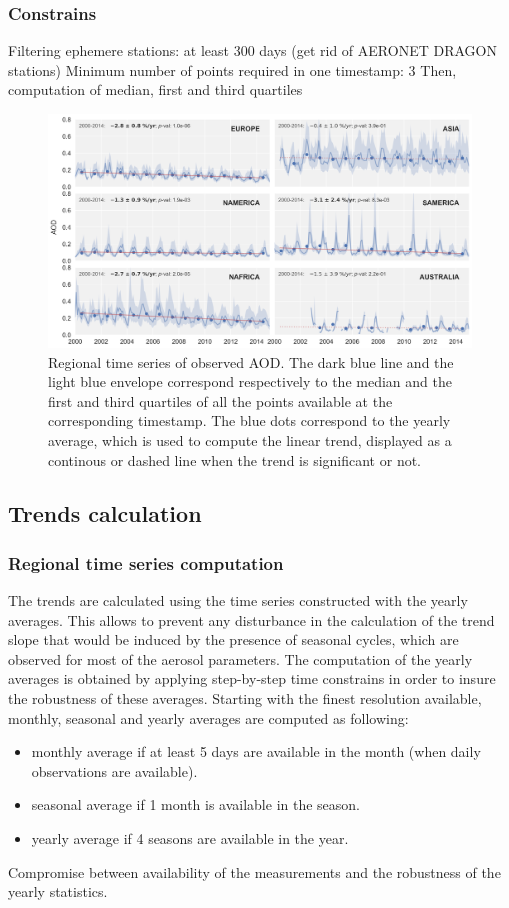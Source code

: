 \documentclass[journal abbreviation, manuscript]{copernicus}
\begin{document}
\subsubsection{Constrains}
Filtering ephemere stations: at least 300 days (get rid of AERONET DRAGON stations)
Minimum number of points required in one timestamp: 3
Then, computation of median, first and third quartiles
\begin{figure}
 \includegraphics[width=\columnwidth]{../scripts/figs/ts/panel-od550aer.png}
 \caption{Regional time series of observed AOD. The dark blue line and the light blue envelope correspond respectively to the median and the first and third quartiles of all the points available at the corresponding timestamp. The blue dots correspond to the yearly average, which is used to compute the linear trend, displayed as a continous or dashed line when the trend is significant or not.}
 \label{ts_aod}
\end{figure}



\subsection{Trends calculation}

\subsubsection{Regional time series computation}
The trends are calculated using the time series constructed with the yearly averages. This allows to prevent any disturbance in the calculation of the trend slope that would be induced by the presence of seasonal cycles, which are observed for most of the aerosol parameters. The computation of the yearly averages is obtained by applying step-by-step time constrains in order to insure the robustness of these averages. Starting with the finest resolution available, monthly, seasonal and yearly averages are computed as following:
\begin{itemize}
 \item monthly average if at least 5 days are available in the month (when daily observations are available).
 \item seasonal average if 1 month is available in the season.
 \item yearly average if 4 seasons are available in the year.
\end{itemize}
Compromise between availability of the measurements and the robustness of the yearly statistics.
\end{document}
